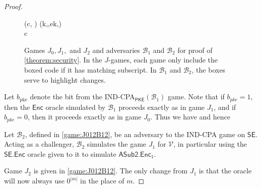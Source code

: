 \begin{proof}
\begin{figure}
\begin{pchstack}
\begin{pcvstack}
{	\pcind (c, \tau) \sample {}(k,,ek,\tau) \\
	\pcreturn c
}
\pcvspace
{}
\end{pcvstack}
\end{pchstack}
\caption[Games $J_0,J_1,$ and $J_2$ and adversaries $\mathcal{B}_1$ and $\mathcal{B}_2$ for proof of \autoref{theorem:security}]{Games $J_0,J_1,$ and $J_2$ and adversaries $\mathcal{B}_1$ and $\mathcal{B}_2$ for proof of \autoref{theorem:security}. In the $J$-games, each game only include the boxed code if it has matching subscript. In $\mathcal{B}_1$ and $\mathcal{B}_2$, the boxes serve to highlight changes.}
\label{game:J012B12}
\end{figure}

Let $b_\text{pke}$ denote the bit from the IND-CPA$_\mathsf{PKE}(\mathcal{B}_1)$ game. Note that if $b_{pke}=1$, then the $\mathsf{Enc}$ oracle simulated by $\mathcal{B}_1$ proceeds exactly as in game $J_1$, and if $b_{pke}=0$, then it proceeds exactly as in game $J_0$. Thus we have
and hence

Let $\mathcal{B}_2$, defined in \autoref{game:J012B12}, be an adversary to the IND-CPA game on $\mathsf{SE}$. Acting as a challenger, $\mathcal{B}_2$ simulates the game $J_1$ for $\mathcal{V}$, in particular using the $\mathsf{SE.Enc}$ oracle given to it to simulate $\mathsf{ASub2.Enc}_1$.

Game $J_2$ is given in \autoref{game:J012B12}. The only change from $J_1$ is that the oracle will now always use $0^{|m|}$ in the place of $m$.


\end{proof}
